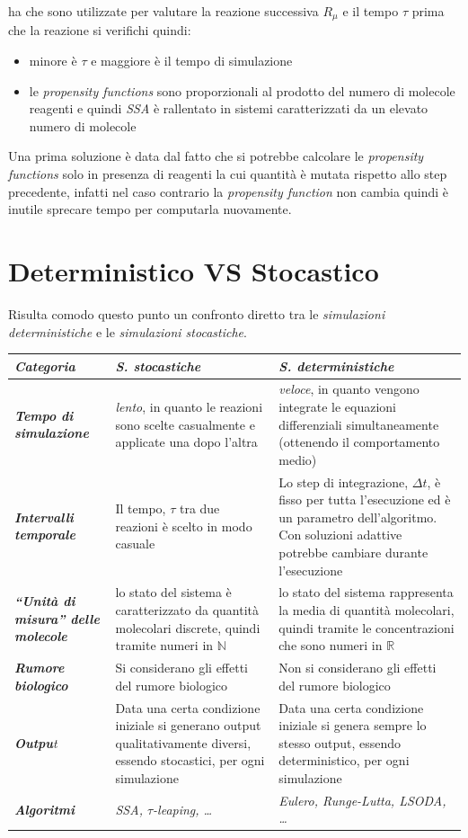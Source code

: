 \documentclass[a4paper,12pt, oneside]{book}
\begin{document}
ha che sono utilizzate per valutare la reazione successiva $R_\mu$ e il tempo
$\tau$ prima che la reazione si verifichi quindi:
\begin{itemize}
  \item minore è $\tau$ e maggiore è il tempo di simulazione
  \item le \textit{propensity functions} sono proporzionali al prodotto del
  numero di molecole reagenti e quindi \textit{SSA} è rallentato in sistemi
  caratterizzati da un elevato numero di molecole
\end{itemize}
Una prima soluzione è data dal fatto che si potrebbe calcolare le
\textit{propensity functions} solo in presenza di reagenti la cui quantità è
mutata rispetto allo step precedente, infatti nel caso contrario la
\textit{propensity function} non cambia quindi è inutile sprecare tempo per
computarla nuovamente.
\section{Deterministico VS Stocastico}
Risulta comodo questo punto un confronto diretto tra le \textit{simulazioni
  deterministiche} e le \textit{simulazioni stocastiche}.
\begin{table}[H]
  \centering
  \small
  \begin{tabulary}{\linewidth}{p{5em}|p{13em}|p{14em}}
    \textit{Categoria} & \textbf{\textit{S. stocastiche}}
    & \textbf{\textit{S. deterministiche}}\\
    \hline
    \textit{\textbf{Tempo di simulazione}}
    & \textit{lento}, in quanto le reazioni
    sono scelte casualmente e applicate una dopo
    l'altra
    & \textit{veloce}, in quanto vengono integrate le equazioni differenziali
    simultaneamente (ottenendo il comportamento medio)\\
    \hline
    \textit{\textbf{Intervalli temporale}}
    & Il tempo, $\tau$ tra due reazioni è scelto
    in modo casuale
    & Lo step di integrazione, $\Delta t$, è fisso per tutta l'esecuzione ed è
    un parametro
    dell'algoritmo. Con soluzioni adattive potrebbe cambiare durante
    l'esecuzione  \\
    \hline
    \textit{\textbf{``Unità di misura'' delle molecole}}
    & lo stato del sistema è caratterizzato da quantità molecolari discrete,
    quindi tramite numeri in $\mathbb{N}$
    & lo stato del sistema rappresenta la media di quantità molecolari, quindi
    tramite le concentrazioni che sono numeri in $\mathbb{R}$\\
    \hline
    \textit{\textbf{Rumore biologico}}
    & Si considerano gli effetti del rumore biologico
    & Non si considerano gli effetti del rumore biologico\\
    \hline
    \textit{\textbf{Outpu}t}
    & Data una certa condizione iniziale si generano output qualitativamente
    diversi, essendo stocastici, per ogni simulazione
    & Data una certa condizione iniziale si genera sempre lo stesso output,
    essendo deterministico, per ogni simulazione  \\
    \hline
    \textbf{\textit{Algoritmi}}
    & \textit{SSA, $\tau$-leaping, \ldots} & \textit{Eulero, Runge-Lutta,
      LSODA, \ldots} 
  \end{tabulary}
\end{table}
\end{document}

